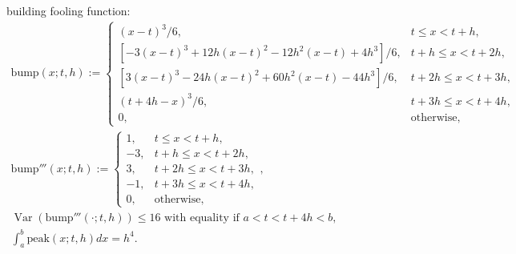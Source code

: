 \documentclass{iitthesis}
\DeclareMathOperator{\Var}{Var}
\theoremstyle{definition}
\theoremstyle{remark}
\begin{document}
building fooling function:
\begin{subequations} \label{bumpfunction}
\begin{gather}
\text{bump}(x;t,h):= \begin{cases} \displaystyle (x-t)^3/6, & t \le x < t+h,\\[1ex]
\displaystyle [-3(x-t)^3+12h(x-t)^2-12h^2(x-t)+4h^3]/6, & t+h \le x < t+2h,\\[1ex]
\displaystyle [3(x-t)^3-24h(x-t)^2+60h^2(x-t)-44h^3]/6, & t+2h \le x < t+3h,\\[1ex]
\displaystyle (t+4h-x)^3/6, & t+3h \le x < t+4h,\\[1ex]
\displaystyle  0, & \text{otherwise},
\end{cases}
\\
\text{bump}'''(x;t,h):= \begin{cases} \displaystyle 1, & t \le x < t+h,\\[1ex]
\displaystyle -3, & t+h \le x < t+2h,\\[1ex]
\displaystyle 3, & t+2h \le x < t+3h,\\[1ex]
\displaystyle -1, & t+3h \le x < t+4h,\\[1ex]
\displaystyle  0, & \text{otherwise},
\end{cases}, \\
\Var(\text{bump}'''(\cdot;t,h))\le 16 \text{ with equality if } a<t<t+4h<b, \\
\int_{a}^{b}\text{peak}(x;t,h)dx=h^4.
\end{gather}
\end{subequations}
\end{document}

